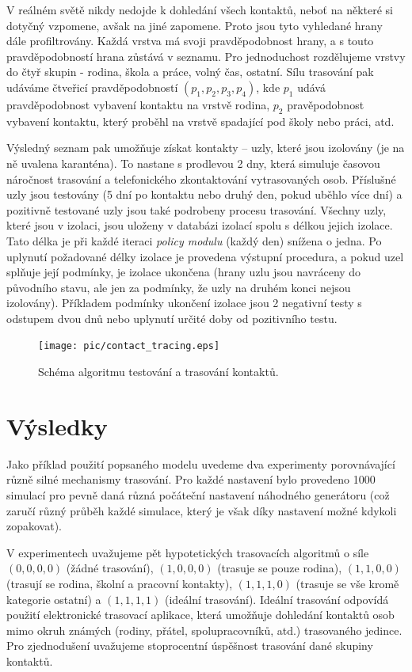 V reálném světě nikdy nedojde k dohledání všech kontaktů, neboť na některé si dotyčný vzpomene, avšak na jiné zapomene. Proto jsou tyto vyhledané hrany dále
profiltrovány. Každá vrstva má svoji pravděpodobnost  hrany, a s touto
pravděpodobností hrana zůstává v seznamu. Pro jednoduchost rozdělujeme vrstvy
do čtyř skupin - rodina, škola a práce, volný čas, ostatní. Sílu trasování pak
udáváme čtveřicí pravděpodobností $(p_1, p_2, p_3, p_4)$, kde 
$p_1$ udává pravděpodobnost vybavení kontaktu na vrstvě rodina, $p_2$
pravěpodobnost vybavení kontaktu, který proběhl na vrstvě spadající pod školy
nebo práci, atd.


Výsledný seznam pak umožňuje získat kontakty -- uzly, které jsou izolovány (je na
ně uvalena karanténa). To nastane s prodlevou 2 dny, která simuluje časovou
náročnost trasování a telefonického zkontaktování vytrasovaných osob.
Příslušné uzly jsou testovány (5 dní po kontaktu nebo druhý den, pokud uběhlo
více dní) a pozitivně testované uzly jsou také podrobeny procesu trasování. 
Všechny uzly, které jsou v izolaci, jsou uloženy v databázi izolací spolu s délkou
jejich izolace. Tato délka je při každé iteraci {\em policy modulu} (každý den)
snížena o jedna. Po uplynutí požadované délky izolace je provedena výstupní
procedura, a pokud uzel splňuje její podmínky, je izolace ukončena (hrany uzlu
jsou navráceny do původního stavu, ale jen za podmínky, že uzly na druhém konci
nejsou izolovány). Příkladem podmínky ukončení izolace jsou 2 negativní testy s
odstupem dvou dnů nebo uplynutí určité doby od pozitivního testu.


\begin{figure}
  \centering \texttt{[image: pic/contact\_tracing.eps]}
  \caption{Schéma algoritmu testování a trasování kontaktů.}
  \label{pg:fig:ct}
\end{figure}

\section*{Výsledky}
Jako příklad použití popsaného modelu uvedeme dva experimenty porovnávající
různě silné mechanismy trasování. Pro každé nastavení bylo provedeno 1000
simulací pro pevně daná různá počáteční nastavení náhodného
generátoru (což zaručí různý průběh každé simulace, který je však díky nastavení možné kdykoli zopakovat).

V experimentech uvažujeme pět hypotetických trasovacích algoritmů o
síle $(0, 0, 0, 0)$ (žádné trasování), $(1, 0, 0, 0)$ (trasuje se
pouze rodina), $(1, 1, 0, 0)$ (trasují se rodina, školní a pracovní
kontakty), $(1, 1, 1, 0)$ (trasuje se vše kromě kategorie ostatní) a
$(1, 1, 1, 1)$ (ideální trasování). Ideální trasování odpovídá použití
elektronické trasovací aplikace, která umožňuje dohledání kontaktů
osob mimo okruh známých (rodiny, přátel, spolupracovníků, atd.) trasovaného jedince. Pro zjednodušení
uvažujeme stoprocentní úspěšnost trasování dané skupiny kontaktů.

